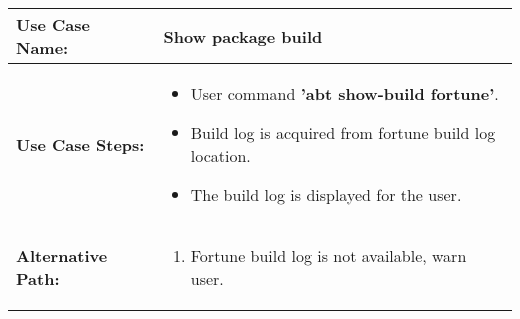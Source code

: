 \medskip

\begin{tabularx}{\linewidth}{|l|X|}
\hline
\textbf{Use Case Name:} & \textbf{Show package build} \\
\hline
\textbf{Use Case Steps:} & 
\begin{minipage}{\linewidth} 
  \vspace{0.05em}
  \begin{itemize}
    \item User command \textbf{'abt show-build fortune'}.
    \item Build log is acquired from fortune build log location.
    \item The build log is displayed for the user.
  \end{itemize}
  \vspace{0.05em}
\end{minipage}
\\
\hline 
\textbf{Alternative Path:} &
\begin{minipage}{\linewidth}
  \vspace{0.05em} 
  \begin{enumerate}
    \item Fortune build log is not available, warn user.
  \end{enumerate}
  \vspace{0.05em} 
\end{minipage}
\\
\hline
\end{tabularx}